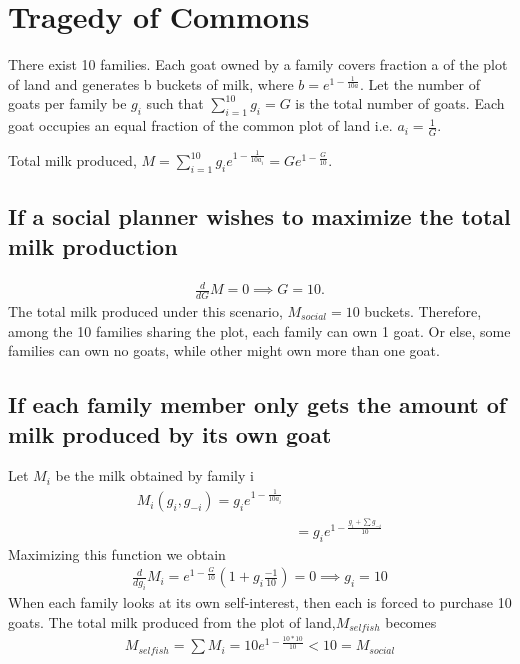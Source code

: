 \documentclass[11pt]{article}
\theoremstyle{definition}
\begin{document}


\section{Tragedy of Commons}
There exist 10 families. Each goat owned by a family covers fraction a of the plot of land and generates b buckets of milk, where $b = e^{1-\frac{1}{10a}}$. 
Let the number of goats per family be $g_i$ such that $\sum^{10}_{i=1}g_i = G$ is the total number of goats. Each goat occupies an equal fraction of the common plot of land i.e. $a_i = \frac{1}{G}$.

Total milk produced, $M = \sum_{i=1}^{10} g_ie^{1-\frac{1}{10a_i}} = G e^{1-\frac{G}{10}}$.

\subsection{If a social planner wishes to maximize the total milk production}
\begin{align*}
\frac{d}{dG}M = 0 \implies G = 10.
\end{align*}
The total milk produced under this scenario, $M_{social} = 10$ buckets.
Therefore, among the 10 families sharing the plot, each family can own 1 goat. Or else, some families can own no goats, while other might own more than one goat.

\subsection{If each family member only gets the amount of milk produced by its own goat}
Let $M_i$ be the milk obtained by family i
\begin{align*}
M_i(g_i, g_{-i}) = g_i e^{1-\frac{1}{10a_i}}\\
& = g_i e^{1-\frac{g_i + \sum g_{-i}}{10}}
\end{align*}
Maximizing this function we obtain
\begin{align*}
\frac{d}{dg_i}M_i = e^{1-\frac{G}{10}}(1 + g_i \frac{-1}{10}) = 0 \implies g_i = 10
\end{align*}
When each family looks at its own self-interest, then each is forced to purchase 10 goats.
The total milk produced from the plot of land,$M_{selfish}$ becomes
\begin{align*}
M_{selfish} = \sum M_i = 10 e^{1-\frac{10*10}{10}} < 10 = M_{social}
\end{align*}
\end{document}
